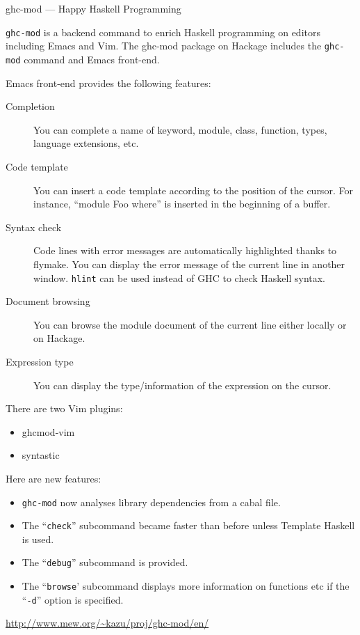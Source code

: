 \begin{hcarentry}[updated]{ghc-mod --- Happy Haskell Programming}
\makeheader

{\tt ghc-mod} is a backend command to enrich Haskell programming on editors including Emacs and Vim. The ghc-mod package on Hackage includes the {\tt ghc-mod} command and Emacs front-end. 

Emacs front-end provides the following features:

\begin{description}
\item[Completion] You can complete a name of keyword, module, class, function, types, language extensions, etc.

\item[Code template] You can insert a code template according to the position of the cursor. For instance, ``module Foo where'' is inserted in the beginning of a buffer.

\item[Syntax check] Code lines with error messages are automatically highlighted thanks to flymake. You can display the error message of the current line in another window. {\tt hlint} %
can be used instead of GHC to check Haskell syntax. 

\item[Document browsing] You can browse the module document of the current line either locally or on Hackage.

\item[Expression type] You can display the type/information of the expression on the cursor. 
\end{description}

There are two Vim plugins:

\begin{itemize}
\item ghcmod-vim
\item syntastic
\end{itemize}

Here are new features:

\begin{itemize}
\item {\tt ghc-mod} now analyses library dependencies from a cabal file.
\item The ``{\tt check}'' subcommand became faster than before unless Template Haskell is used. 
\item The ``{\tt debug}'' subcommand is provided.
\item The ``{\tt browse}' subcommand displays more information on functions etc if the ``{\tt -d}'' option is specified.
\end{itemize}

\FurtherReading
  \url{http://www.mew.org/~kazu/proj/ghc-mod/en/}
\end{hcarentry}
